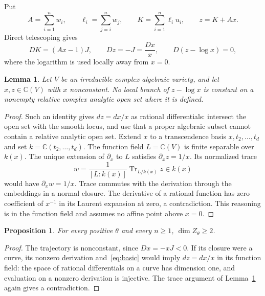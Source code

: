 \documentclass[11pt]{article}
\newtheorem{lemma}[theorem]{Lemma}
\newtheorem{proposition}[theorem]{Proposition}
\theoremstyle{remark}\newtheorem{remark}[theorem]{Remark}
\newcommand{\C}{\mathbb C}
\DeclareMathOperator{\Tr}{Tr}
\begin{document}
Put
\begin{equation}\label{eq:H}
 A=\sum_{i=1}^n w_i,\qquad \ell_i=\sum_{j=i}^n w_j,\qquad K=\sum_{i=1}^n\ell_i u_i,\qquad z=K+Ax.
\end{equation}
Direct telescoping gives
\begin{equation}\label{eq:basic}
 DK=(Ax-1)J,\qquad Dz=-J=\frac{Dx}{x},\qquad D(z-\log x)=0,
\end{equation}
where the logarithm is used locally away from $x=0$.

\begin{lemma}\label{lem:log}
Let $V$ be an irreducible complex algebraic variety, and let $x,z\in\C(V)$ with $x$ nonconstant. No local branch of $z-\log x$ is constant on a nonempty relative complex analytic open set where it is defined.
\end{lemma}
\begin{proof}
Such an identity gives $dz=dx/x$ as rational differentials: intersect the open set with the smooth locus, and use that a proper algebraic subset cannot contain a relative analytic open set. Extend $x$ to a transcendence basis $x,t_2,\ldots,t_d$ and set $k=\C(t_2,\ldots,t_d)$. The function field $L=\C(V)$ is finite separable over $k(x)$. The unique extension of $\partial_x$ to $L$ satisfies $\partial_xz=1/x$. Its normalized trace
\[
 w=\frac{1}{[L:k(x)]}\Tr_{L/k(x)}z\in k(x)
\]
would have $\partial_xw=1/x$. Trace commutes with the derivation through the embeddings in a normal closure. The derivative of a rational function has zero coefficient of $x^{-1}$ in its Laurent expansion at zero, a contradiction. This reasoning is in the function field and assumes no affine point above $x=0$.
\end{proof}

\begin{proposition}\label{prop:dim}
For every positive $\theta$ and every $n\geq1$, $\dim Z_\theta\geq2$.
\end{proposition}
\begin{proof}
The trajectory is nonconstant, since $Dx=-xJ<0$. If its closure were a curve, its nonzero derivation and~\eqref{eq:basic} would imply $dz=dx/x$ in its function field: the space of rational differentials on a curve has dimension one, and evaluation on a nonzero derivation is injective. The trace argument of Lemma~\ref{lem:log} again gives a contradiction.
\end{proof}
\end{document}

